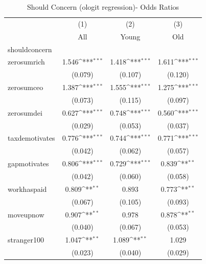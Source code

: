 \begin{table}[htbp]\centering
\def\sym#1{\ifmmode^{#1}\else\(^{#1}\)\fi}
\caption{Should Concern (ologit regression)- Odds Ratios}
\begin{tabular}{l*{3}{c}}
\toprule
            &\multicolumn{1}{c}{(1)}&\multicolumn{1}{c}{(2)}&\multicolumn{1}{c}{(3)}\\
            &\multicolumn{1}{c}{All}&\multicolumn{1}{c}{Young}&\multicolumn{1}{c}{Old}\\
\midrule
shouldconcern&                     &                     &                     \\
zerosumrich &       1.546\sym{***}&       1.418\sym{***}&       1.611\sym{***}\\
            &     (0.079)         &     (0.107)         &     (0.120)         \\
\addlinespace
zerosumceo  &       1.387\sym{***}&       1.555\sym{***}&       1.275\sym{***}\\
            &     (0.073)         &     (0.115)         &     (0.097)         \\
\addlinespace
zerosumdei  &       0.627\sym{***}&       0.748\sym{***}&       0.560\sym{***}\\
            &     (0.029)         &     (0.053)         &     (0.037)         \\
\addlinespace
taxdemotivates&       0.776\sym{***}&       0.744\sym{***}&       0.771\sym{***}\\
            &     (0.042)         &     (0.062)         &     (0.057)         \\
\addlinespace
gapmotivates&       0.806\sym{***}&       0.729\sym{***}&       0.839\sym{**} \\
            &     (0.042)         &     (0.060)         &     (0.058)         \\
\addlinespace
workhaspaid &       0.809\sym{**} &       0.893         &       0.773\sym{**} \\
            &     (0.067)         &     (0.105)         &     (0.093)         \\
\addlinespace
moveupnow   &       0.907\sym{**} &       0.978         &       0.878\sym{**} \\
            &     (0.040)         &     (0.067)         &     (0.053)         \\
\addlinespace
stranger100 &       1.047\sym{**} &       1.089\sym{**} &       1.029         \\
            &     (0.023)         &     (0.040)         &     (0.029)         \\

\end{tabular}
\end{table}
